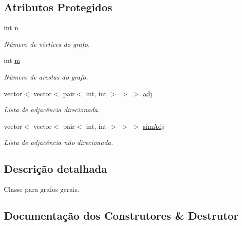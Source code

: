 \subsection*{Atributos Protegidos}
\begin{DoxyCompactItemize}
\item 
\mbox{\label{classGraphGen_af0087a36d5f72076ae87b0f9022c0033}} 
int \mbox{\hyperlink{classGraphGen_af0087a36d5f72076ae87b0f9022c0033}{n}}
\begin{DoxyCompactList}\small\item\em Número de vértices do grafo. \end{DoxyCompactList}\item 
\mbox{\label{classGraphGen_aa313851fc05ee0f7a2ce768ba296e944}} 
int \mbox{\hyperlink{classGraphGen_aa313851fc05ee0f7a2ce768ba296e944}{m}}
\begin{DoxyCompactList}\small\item\em Número de arestas do grafo. \end{DoxyCompactList}\item 
\mbox{\label{classGraphGen_ae1cc2cf59230c1cdff45fa6848f1bf1f}} 
vector$<$ vector$<$ pair$<$ int, int $>$ $>$ $>$ \mbox{\hyperlink{classGraphGen_ae1cc2cf59230c1cdff45fa6848f1bf1f}{adj}}
\begin{DoxyCompactList}\small\item\em Lista de adjacência direcionada. \end{DoxyCompactList}\item 
\mbox{\label{classGraphGen_a6bfecbfc2aca704e5107dd667a23a1c0}} 
vector$<$ vector$<$ pair$<$ int, int $>$ $>$ $>$ \mbox{\hyperlink{classGraphGen_a6bfecbfc2aca704e5107dd667a23a1c0}{sim\+Adj}}
\begin{DoxyCompactList}\small\item\em Lista de adjacência não direcionada. \end{DoxyCompactList}\end{DoxyCompactItemize}


\subsection{Descrição detalhada}
Classe para grafos gerais. 

\subsection{Documentação dos Construtores \& Destrutor}
\mbox{\label{classGraphGen_aec08708894158ba3098873e7a1da6b60}} 
